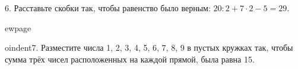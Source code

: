 6. Расставьте скобки так, чтобы равенство было верным: $20:2+7\cdot2-5=29.$

ewpage

oindent7. Разместите числа 1, 2, 3, 4, 5, 6, 7, 8, 9 в пустых кружках так, чтобы сумма трёх чисел расположенных на каждой прямой, была равна 15.
\begin{center}
\begin{figure}[h!]
\end{figure}
\end{center}
